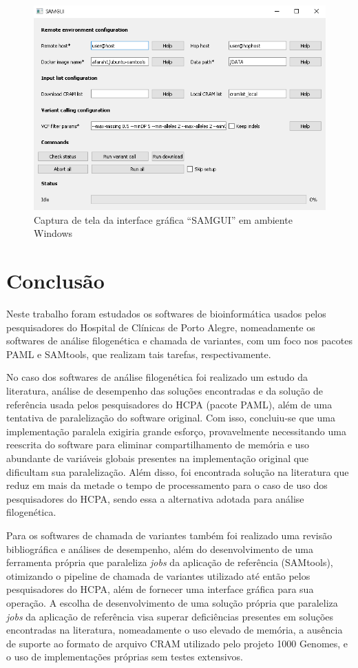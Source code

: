 \documentclass[cic,tc]{iiufrgs}
\begin{document}
\begin{figure}
  \caption{Captura de tela da interface gráfica ``SAMGUI'' em ambiente Windows}
    \begin{center}
      \includegraphics[width=0.85\linewidth]{img/samgui_windows.png}
    \end{center}
    \label{fig:samgui_windows}
\end{figure}

\chapter{Conclusão}

Neste trabalho foram estudados os softwares de bioinformática usados pelos
pesquisadores do Hospital de Clínicas de Porto Alegre, nomeadamente os
softwares de análise filogenética e chamada de variantes, com um foco nos
pacotes PAML e SAMtools, que realizam tais tarefas, respectivamente.

No caso dos softwares de análise filogenética foi realizado um estudo da
literatura, análise de desempenho das soluções encontradas e da solução de
referência usada pelos pesquisadores do HCPA (pacote PAML), além de uma
tentativa de paralelização do software original. Com isso, concluiu-se que uma
implementação paralela exigiria grande esforço, provavelmente necessitando uma
reescrita do software para eliminar compartilhamento de memória e uso
abundante de variáveis globais presentes na implementação original que
dificultam sua paralelização. Além disso, foi encontrada solução na literatura
que reduz em mais da metade o tempo de processamento para o caso de uso dos
pesquisadores do HCPA, sendo essa a alternativa adotada para análise
filogenética.

Para os softwares de chamada de variantes também foi realizado uma revisão
bibliográfica e análises de desempenho, além do desenvolvimento de uma
ferramenta própria que paraleliza \textit{jobs} da aplicação de referência
(SAMtools), otimizando o pipeline de chamada de variantes utilizado até então
pelos pesquisadores do HCPA, além de fornecer uma interface gráfica para sua
operação. A escolha de desenvolvimento de uma solução própria que paraleliza
\textit{jobs} da aplicação de referência visa superar deficiências presentes em
soluções encontradas na literatura, nomeadamente o uso elevado de memória, a
ausência de suporte ao formato de arquivo CRAM utilizado pelo projeto 1000
Genomes, e o uso de implementações próprias sem testes extensivos.
\end{document}
